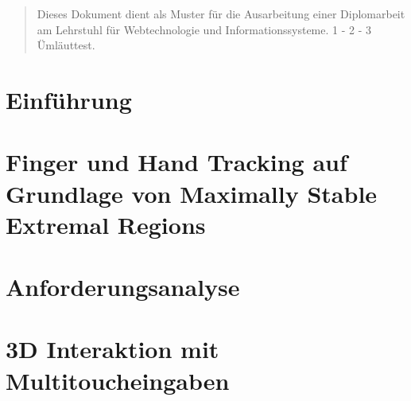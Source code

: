 \documentclass[pdftex,12pt,a4paper]{report}
\begin{document}

\deckblatt



\erklaerung



\begin{abstract}

Dieses Dokument dient als Muster für die Ausarbeitung einer Diplomarbeit
am Lehrstuhl für Webtechnologie und Informationssysteme. 
1 - 2 - 3 Ümläuttest.

\end{abstract}



\tableofcontents



\chapter{Einführung}
\label{chp:einfuehrung}



\chapter{Finger und Hand Tracking auf Grundlage von Maximally Stable Extremal Regions}
\label{chp:mser}



\chapter{Anforderungsanalyse}
\label{chp:anforderungsanalyse}



\chapter{3D Interaktion mit Multitoucheingaben}
\label{chp:interaktion_mit_multitoucheingaben}

\end{document}
